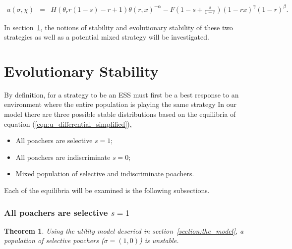 \documentclass[10pt]{article}
\newtheorem{theorem}{Theorem}
\begin{document}
\begin{eqnarray}
\label{eqn:tutility2}
u(\sigma, \chi) &=&
H (\theta_r r(1-s) - r + 1)\theta(r,x)^{-\alpha} - F\left(1-s + \frac{s}{1-r} \right)(1-rx)^{\gamma}(1-r)^{\beta} .
\end{eqnarray}

In section~\ref{section:evolutionary_stability}, the notions of stability
and evolutionary stability of these two strategies as well as a potential 
mixed strategy will be investigated.

\section{Evolutionary Stability}\label{section:evolutionary_stability}

By definition, for a strategy to be an ESS must first be a best response to an 
environment where the entire population is playing the same strategy
In our model there are three possible stable distributions based on the
equilibria of equation (\ref{eqn:u_differential_simplified}),

\begin{itemize} 
	\item All poachers are selective \(s=1\);
	\item All poachers are indiscriminate \(s=0\);
	\item Mixed population of selective and indiscriminate poachers.
\end{itemize}

Each of the equilibria will be examined is the following subsections.

\subsubsection{All poachers are selective \(s=1\)}

\begin{theorem}
Using the utility model descried in section~\ref{section:the_model}, 
a population of selective poachers (\(\sigma=(1, 0)\)) is unstable.
\end{theorem}
\end{document}
